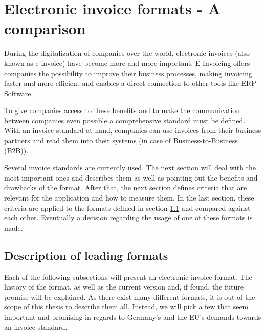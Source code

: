 %
% 
\chapter{Electronic invoice formats - A comparison}
\label{cha2}

During the digitalization of companies over the world, electronic invoices (also known as e-invoice) have become more and more important. E-Invoicing offers companies the possibility to improve their business processes, making invoicing faster and more efficient and enables a direct connection to other tools like ERP-Software. 

To give companies access to these benefits and to make the communication between companies even possible a comprehensive standard must be defined. With an invoice standard at hand, companies can use invoices from their business partners and read them into their systems (in case of Business-to-Business (B2B)). 

Several invoice standards are currently used. The next section will deal with the most important ones and describes them as well as pointing out the benefits and drawbacks of the format.
After that, the next section defines criteria that are relevant for the application and how to measure them.
In the last section, these criteria are applied to the formats defined in section \ref{sec2.1} and compared against each other. Eventually a decision regarding the usage of one of these formats is made.

\section{Description of leading formats}
\label{sec2.1}

Each of the following subsections will present an electronic invoice format. The history of the format, as well as the current version and, if found, the future promise will be explained. As there exist many different formats, it is out of the scope of this thesis to describe them all. %
Instead, we will pick a few that seem important and promising in regards to Germany's and the EU's demands towards an invoice standard. 

